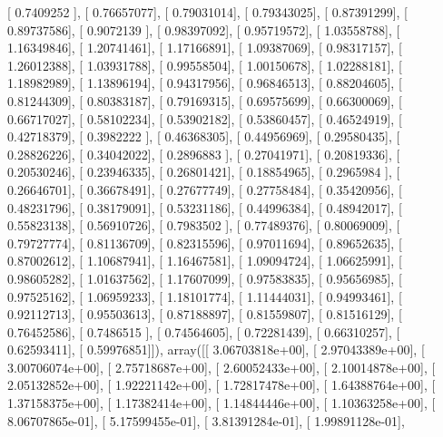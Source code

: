\documentclass{article}
\begin{document}
       [ 0.7409252 ],
       [ 0.76657077],
       [ 0.79031014],
       [ 0.79343025],
       [ 0.87391299],
       [ 0.89737586],
       [ 0.9072139 ],
       [ 0.98397092],
       [ 0.95719572],
       [ 1.03558788],
       [ 1.16349846],
       [ 1.20741461],
       [ 1.17166891],
       [ 1.09387069],
       [ 0.98317157],
       [ 1.26012388],
       [ 1.03931788],
       [ 0.99558504],
       [ 1.00150678],
       [ 1.02288181],
       [ 1.18982989],
       [ 1.13896194],
       [ 0.94317956],
       [ 0.96846513],
       [ 0.88204605],
       [ 0.81244309],
       [ 0.80383187],
       [ 0.79169315],
       [ 0.69575699],
       [ 0.66300069],
       [ 0.66717027],
       [ 0.58102234],
       [ 0.53902182],
       [ 0.53860457],
       [ 0.46524919],
       [ 0.42718379],
       [ 0.3982222 ],
       [ 0.46368305],
       [ 0.44956969],
       [ 0.29580435],
       [ 0.28826226],
       [ 0.34042022],
       [ 0.2896883 ],
       [ 0.27041971],
       [ 0.20819336],
       [ 0.20530246],
       [ 0.23946335],
       [ 0.26801421],
       [ 0.18854965],
       [ 0.2965984 ],
       [ 0.26646701],
       [ 0.36678491],
       [ 0.27677749],
       [ 0.27758484],
       [ 0.35420956],
       [ 0.48231796],
       [ 0.38179091],
       [ 0.53231186],
       [ 0.44996384],
       [ 0.48942017],
       [ 0.55823138],
       [ 0.56910726],
       [ 0.7983502 ],
       [ 0.77489376],
       [ 0.80069009],
       [ 0.79727774],
       [ 0.81136709],
       [ 0.82315596],
       [ 0.97011694],
       [ 0.89652635],
       [ 0.87002612],
       [ 1.10687941],
       [ 1.16467581],
       [ 1.09094724],
       [ 1.06625991],
       [ 0.98605282],
       [ 1.01637562],
       [ 1.17607099],
       [ 0.97583835],
       [ 0.95656985],
       [ 0.97525162],
       [ 1.06959233],
       [ 1.18101774],
       [ 1.11444031],
       [ 0.94993461],
       [ 0.92112713],
       [ 0.95503613],
       [ 0.87188897],
       [ 0.81559807],
       [ 0.81516129],
       [ 0.76452586],
       [ 0.7486515 ],
       [ 0.74564605],
       [ 0.72281439],
       [ 0.66310257],
       [ 0.62593411],
       [ 0.59976851]]), array([[  3.06703818e+00],
       [  2.97043389e+00],
       [  3.00706074e+00],
       [  2.75718687e+00],
       [  2.60052433e+00],
       [  2.10014878e+00],
       [  2.05132852e+00],
       [  1.92221142e+00],
       [  1.72817478e+00],
       [  1.64388764e+00],
       [  1.37158375e+00],
       [  1.17382414e+00],
       [  1.14844446e+00],
       [  1.10363258e+00],
       [  8.06707865e-01],
       [  5.17599455e-01],
       [  3.81391284e-01],
       [  1.99891128e-01],
\end{document}
